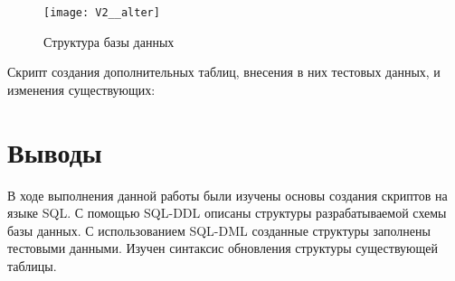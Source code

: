 \begin{figure}[H]
	\centering
	\texttt{[image: V2\_\_alter]}
	\caption{Структура базы данных}
\end{figure}

Скрипт создания дополнительных таблиц, внесения в них тестовых данных, и изменения существующих:



\section{Выводы}

В ходе выполнения данной работы были изучены основы создания скриптов на языке SQL. С помощью SQL-DDL описаны структуры разрабатываемой схемы базы данных. С использованием SQL-DML созданные структуры заполнены тестовыми данными. Изучен синтаксис обновления структуры существующей таблицы.


